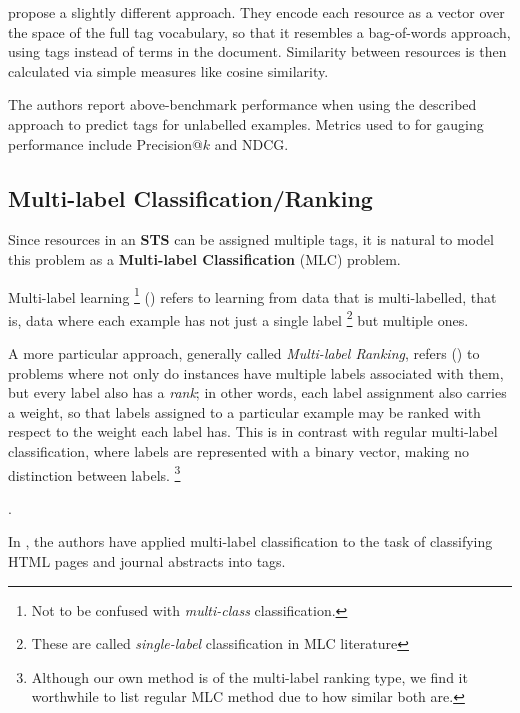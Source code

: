 
\cite{auyeung_etal_2009} propose a slightly different approach. They encode each resource as a vector over the space of the full tag vocabulary, so that it resembles a bag-of-words approach, using tags instead of terms in the document. Similarity between resources is then calculated via simple measures like cosine similarity.

The authors report above-benchmark performance when using the described approach to predict tags for unlabelled examples. Metrics used to for gauging performance include Precision@$k$ and NDCG.


\subsection{Multi-label Classification/Ranking}

Since resources in an \textbf{STS} can be assigned multiple tags, it is natural to model this problem as a \textbf{Multi-label Classification} (MLC) problem.

Multi-label learning \footnote{Not to be confused with \textit{multi-class} classification.} (\cite{tsoumakas_katakis_2007}) refers to learning from data that is multi-labelled, that is, data where each example has not just a single label \footnote{These are called \textit{single-label} classification in MLC literature} but multiple ones.

A more particular approach, generally called \textit{Multi-label Ranking}, refers (\cite{illig_etal_2011}) to problems where not only do instances have multiple labels associated with them, but every label also has a \textit{rank}; in other words, each label assignment also carries a weight, so that labels assigned to a particular example may be ranked with respect to the weight each label has. This is in contrast with regular multi-label classification, where labels are represented with a binary vector, making no distinction between labels. \footnote{Although our own method is of the multi-label ranking type, we find it worthwhile to list regular MLC method due to how similar both are.}

.

In \cite{katakis_etal_2008}, the authors have applied multi-label classification to the task of classifying HTML pages and journal abstracts into tags.

